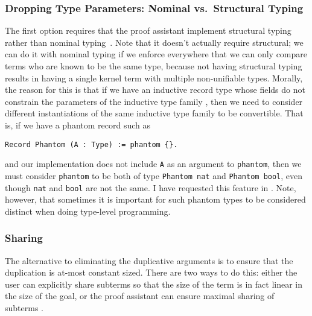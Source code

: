 \subsubsection{Dropping Type Parameters: Nominal vs.~Structural Typing}
The first option requires that the proof assistant implement structural typing~\cite{structural-typing} rather than nominal typing~\cite{nominal-typing}.
 Note that it doesn't actually require structural; we can do it with nominal typing if we enforce everywhere that we can only compare terms who are known to be the same type, because not having structural typing results in having a single kernel term with multiple non-unifiable types.
Morally, the reason for this is that if we have an inductive record type   whose fields do not constrain the parameters of the inductive type family , then we need to consider different instantiations of the same inductive type family to be convertible.
That is, if we have a phantom record such as
\begin{verbatim}
Record Phantom (A : Type) := phantom {}.
\end{verbatim}
and our implementation does not include \texttt{A} as an argument to \texttt{phantom}, then we must consider \texttt{phantom} to be both of type \texttt{Phantom nat} and \texttt{Phantom bool}, even though \texttt{nat} and \texttt{bool} are not the same.
I have requested this feature in \cite{https://github.com/coq/coq/issues/5293}.
Note, however, that sometimes it is important for such phantom types to be considered distinct when doing type-level programming.

\subsubsection{Sharing} \label{sec:sharing}
The alternative to eliminating the duplicative arguments is to ensure that the duplication is at-most constant sized.
There are two ways to do this: either the user can explicitly share subterms so that the size of the term is in fact linear in the size of the goal, or the proof assistant can ensure maximal sharing of subterms .

